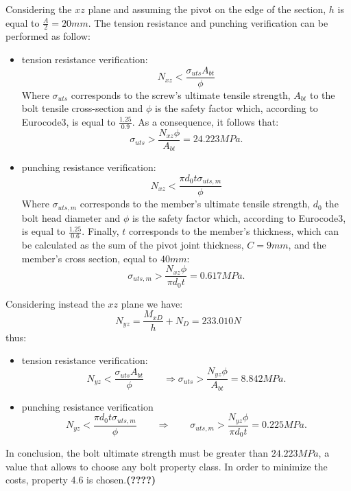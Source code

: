 Considering the $xz$ plane and assuming the pivot on the edge of the section, $h$ is equal to $\frac{A}{2} = 20 mm$. The tension resistance and punching verification can be performed as follow:
\begin{itemize}
    \item tension resistance verification:
    \begin{equation*}
        N_{xz} < \frac{\sigma_{uts}A_{bt}}{\phi}
    \end{equation*}
    Where $\sigma_{uts}$ corresponds to the screw's ultimate tensile strength, $A_{bt}$ to the bolt tensile cross-section and $\phi$ is the safety factor which, according to Eurocode3, is equal to $\frac{1.25}{0.9}$. As a consequence, it follows that:
    \begin{equation*}
       \sigma_{uts} > \frac{N_{xz}\phi}{A_{bt}} = 24.223 MPa.
    \end{equation*}
    \item punching resistance verification:
    \begin{equation*}
        N_{xz} < \frac{\pi d_{0} t \sigma_{uts,m}}{\phi}
    \end{equation*}
    Where $\sigma_{uts,m}$ corresponds to the member's ultimate tensile strength, $d_{0}$ the bolt head diameter and $\phi$ is the safety factor which, according to Eurocode3, is equal to $\frac{1.25}{0.6}$. Finally, $t$ corresponds to the member's thickness, which can be calculated as the sum of the pivot joint thickness, $C = 9 mm$, and the member's cross section, equal to $40 mm$:
     \begin{equation*}
       \sigma_{uts,m} > \frac{N_{xz}\phi}{\pi d_{0}t} = 0.617 MPa.
    \end{equation*}
\end{itemize}
Considering instead the $xz$ plane we have:\\
\begin{equation*}
    N_{yz} = \frac{M_{xD}}{h} + N_{D} = 233.010 N
\end{equation*}
thus:
\begin{itemize}
    \item tension resistance verification:
    \begin{equation*}
        N_{yz} < \frac{\sigma_{uts}A_{bt}}{\phi} \qquad \Rightarrow \sigma_{uts} > \frac{N_{yz}\phi}{A_{bt}} = 8.842 MPa.
    \end{equation*}
    \item punching resistance verification\\
    \begin{equation*}
        N_{yz} < \frac{\pi d_{0} t \sigma_{uts,m}}{\phi} \qquad \Rightarrow \qquad   \sigma_{uts,m} > \frac{N_{yz}\phi}{\pi d_{0}t} = 0.225 MPa.
    \end{equation*}
\end{itemize}
In conclusion, the bolt ultimate strength must be greater than $24.223 MPa$, a value that allows to choose any bolt property class. In order to minimize the costs, property 4.6 is chosen.\textbf{(????)} 

